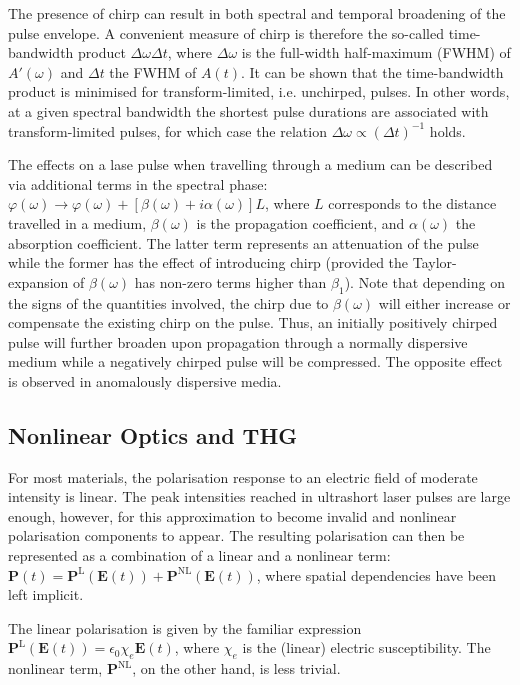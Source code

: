 \documentclass[a4paper]{jpconf}
\begin{document}
The presence of chirp can result in both spectral and temporal broadening of the pulse envelope. A convenient measure of chirp is therefore the so-called time-bandwidth product $\Delta \omega \Delta t$, where $\Delta \omega$ is the full-width half-maximum (FWHM) of $A'(\omega)$ and $\Delta t$ the FWHM of $A(t)$. It can be shown that the time-bandwidth product is minimised for transform-limited, i.e. unchirped, pulses. In other words, at a given spectral bandwidth the shortest pulse durations are associated with transform-limited pulses, for which case the relation $\Delta \omega \propto (\Delta t)^{-1}$ holds. \par 
The effects on a lase pulse when travelling through a medium can be described via additional terms in the spectral phase: $\varphi(\omega) \to \varphi(\omega) + [\beta(\omega) + i \alpha(\omega)]L$, where $L$ corresponds to the distance travelled in a medium, $\beta(\omega)$ is the propagation coefficient, and $\alpha(\omega)$ the absorption coefficient. The latter term represents an attenuation of the pulse while the former has the effect of introducing chirp (provided the Taylor-expansion of $\beta(\omega)$ has non-zero terms higher than $\beta_1$). Note that depending on the signs of the quantities involved, the chirp due to $\beta(\omega)$ will either increase or compensate the existing chirp on the pulse. Thus, an initially positively chirped pulse will further broaden upon propagation through a normally dispersive medium while a negatively chirped pulse will be compressed. The opposite effect is observed in anomalously dispersive media.

\subsection{Nonlinear Optics and THG}
For most materials, the polarisation response to an electric field of moderate intensity is linear. The peak intensities reached in ultrashort laser pulses are large enough, however, for this approximation to become invalid and nonlinear polarisation components to appear. The resulting polarisation can then be represented as a combination of a linear and a nonlinear term: $\mathbf{P}(t) = \mathbf{P}^\text{L}(\mathbf{E}(t)) + \mathbf{P}^\text{NL} (\mathbf{E}(t))$, where spatial dependencies have been left implicit. \par 
The linear polarisation is given by the familiar expression $\mathbf{P}^\text{L}(\mathbf{E}(t)) = \epsilon_0 \chi_e \mathbf{E}(t)$, where $\chi_e$ is the (linear) electric susceptibility. The nonlinear term, $\mathbf{P}^\text{NL}$, on the other hand, is less trivial. 
\end{document}
